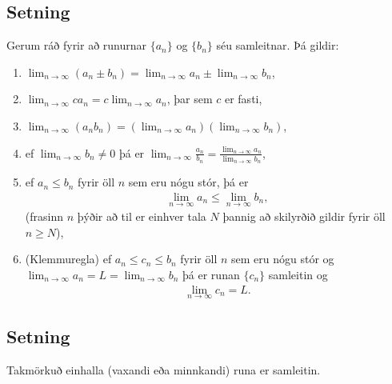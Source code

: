 \documentclass[b5paper,10pt,icelandic]{sphinxmanual}
\begin{document}
\subsection{Setning}
\label{\detokenize{kafli09:id4}}
Gerum ráð fyrir að runurnar \(\{a_n\}\) og \(\{b_n\}\) séu
samleitnar. Þá gildir:
\begin{enumerate}
\item {} 
\(\lim_{n\rightarrow\infty}(a_n\pm b_n)=
\lim_{n\rightarrow\infty}a_n\pm\lim_{n\rightarrow\infty}b_n\),

\item {} 
\(\lim_{n\rightarrow\infty}ca_n=
c\lim_{n\rightarrow\infty}a_n\), þar sem \(c\) er fasti,

\item {} 
\(\lim_{n\rightarrow\infty}(a_n b_n)=
(\lim_{n\rightarrow\infty}a_n)(\lim_{n\rightarrow\infty}b_n)\),

\item {} 
ef \(\lim_{n\rightarrow\infty}b_n\neq 0\) þá er
\(\lim_{n\rightarrow\infty}\frac{a_n}{b_n}=
\frac{\lim_{n\rightarrow\infty}a_n}{\lim_{n\rightarrow\infty}b_n}\),

\item {} 
ef \(a_n\leq b_n\) fyrir öll \(n\) sem eru nógu stór, þá
er
\begin{equation*}
\begin{split}\lim_{n\rightarrow\infty}a_n\leq\lim_{n\rightarrow\infty}b_n,\end{split}
\end{equation*}
(frasinn  \(n\)  þýðir að til er
einhver tala \(N\) þannig að skilyrðið gildir fyrir öll
\(n\geq N\)),

\item {} 
(Klemmuregla) ef \(a_n\leq c_n\leq b_n\) fyrir öll \(n\)
sem eru nógu stór og
\(\lim_{n\rightarrow\infty}a_n=L=\lim_{n\rightarrow\infty}b_n\)
þá er runan \(\{c_n\}\) samleitin og
\begin{equation*}
\begin{split}\lim_{n\rightarrow\infty}c_n=L.\end{split}
\end{equation*}
\end{enumerate}


\subsection{Setning}
\label{\detokenize{kafli09:id5}}
Takmörkuð einhalla (vaxandi eða minnkandi) runa er samleitin.
\end{document}
